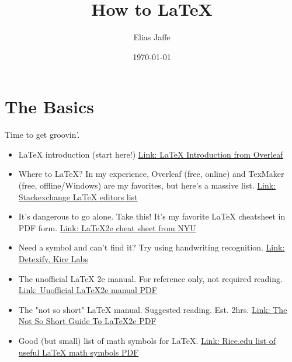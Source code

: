 \documentclass{article}
\title{How to \LaTeX}
\author{Elias Jaffe}
\date{\today}
\newcommand{\latex}{\LaTeX \xspace}
\begin{document}
\maketitle

\section{The Basics}
Time to get groovin'.
\begin{itemize}
    \item \latex introduction (start here!) \href{https://www.overleaf.com/learn/latex/Free_online_introduction_to_LaTeX_(part_1)}{Link: \latex Introduction from Overleaf}
    \item Where to \latex? In my experience, Overleaf (free, online) and TexMaker (free, offline/Windows) are my favorites, but here's a massive list. \href{https://tex.stackexchange.com/questions/339/latex-editors-ides}{Link: Stackexchange \latex editors list}
    \item It's dangerous to go alone. Take this! It's my favorite \latex cheatsheet in PDF form. \href{https://www.nyu.edu/projects/beber/files/Chang_LaTeX_sheet.pdf}{Link: \LaTeX 2e cheat sheet from NYU}
    \item Need a symbol and can't find it? Try using handwriting recognition. \href{https://detexify.kirelabs.org/classify.html}{Link: Detexify, Kire Labs}
    \item The unofficial \latex 2e manual. For reference only, not required reading. \href{http://texdoc.net/texmf-dist/doc/latex/latex2e-help-texinfo/latex2e.pdf}{Link: Unofficial \LaTeX 2e manual PDF}
    \item The "not so short" \latex manual. Suggested reading. Est. 2hrs. \href{http://ctan.mirrors.hoobly.com/info/lshort/english/lshort.pdf}{Link: The Not So Short Guide To \LaTeX 2e PDF}
    \item Good (but small) list of math symbols for \latex. \href{https://www.caam.rice.edu/~heinken/latex/symbols.pdf}{Link: Rice.edu list of useful \latex math symbols PDF}
\end{itemize}
\end{document}
